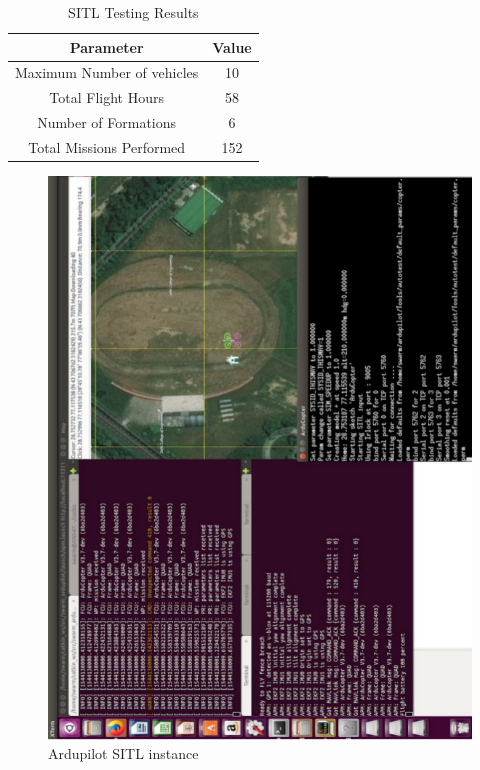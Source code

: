 \begin{spacing}{2}
\begin{table}
    \centering
    \caption{SITL Testing Results}
    \begin{tabular}{c|c}
         Parameter &  Value\\\hline
         Maximum Number of vehicles & 10 \\
         Total Flight Hours & 58 \\
         Number of Formations & 6 \\
         Total Missions Performed & 152 
    \end{tabular}
    
    \label{tab:sitlresult}
\end{table}
\begin{figure}
    \centering
    \includegraphics[height = \linewidth, angle=270]{image/sitlscreen.png}
    \caption{Ardupilot SITL instance}
    \label{fig:sitl instance}
\end{figure}
\begin{figure}
    \centering

\end{figure}
\end{spacing}
